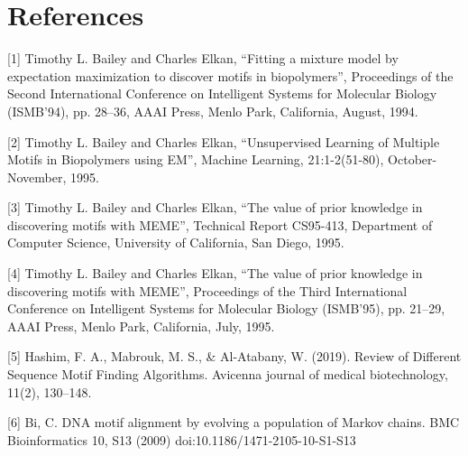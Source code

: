 \documentclass{article}
\begin{document}
\section{References}
[1] Timothy L. Bailey and Charles Elkan, “Fitting a mixture model by expectation maximization to discover motifs in biopolymers”, Proceedings of the Second International Conference on Intelligent Systems for Molecular Biology (ISMB’94), pp. 28–36, AAAI Press, Menlo Park, California, August, 1994.

[2] Timothy L. Bailey and Charles Elkan, “Unsupervised Learning of Multiple Motifs in Biopolymers using EM”, Machine Learning, 21:1-2(51-80), October-November, 1995.

[3] Timothy L. Bailey and Charles Elkan, “The value of prior knowledge in discovering motifs with MEME”, Technical Report CS95-413, Department of Computer Science, University of California, San Diego, 1995.

[4] Timothy L. Bailey and Charles Elkan, “The value of prior knowledge in discovering motifs with MEME”, Proceedings of the Third International Conference on Intelligent Systems for Molecular Biology (ISMB’95), pp. 21–29, AAAI Press, Menlo Park, California, July, 1995.


[5] Hashim, F. A., Mabrouk, M. S., & Al-Atabany, W. (2019). Review of Different Sequence Motif Finding Algorithms. Avicenna journal of medical biotechnology, 11(2), 130–148.

[6] Bi, C. DNA motif alignment by evolving a population of Markov chains. BMC Bioinformatics 10, S13 (2009) doi:10.1186/1471-2105-10-S1-S13
\end{document}
